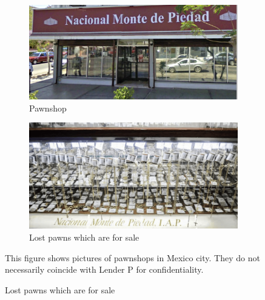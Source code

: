 \begin{figure}[H]
\begin{center}
        \vspace{3ex}

    \begin{subfigure}{0.45\textwidth}
    \caption{Pawnshop}
        \centering
        \includegraphics[width=\textwidth]{Figuras/empenio2_.png}
    \end{subfigure}
    \begin{subfigure}{0.42\textwidth}
    \caption{Lost pawns which are for sale}
        \centering
        \includegraphics[width=\textwidth]{Figuras/empenio3_.png}
    \end{subfigure}
    \end{center}
    \scriptsize
        This figure  shows pictures of pawnshops in Mexico city. They do not necessarily coincide with Lender P for confidentiality. 
\end{figure}



